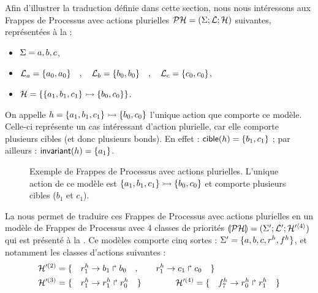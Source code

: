 \begin{example}
  Afin d'illustrer la traduction définie dans cette section,
  nous nous intéressons aux Frappes de Processus avec actions plurielles
  $\mathcal{PH} = (\Sigma; \mathcal{L}; \mathcal{H})$ suivantes,
  représentées à la  :
  \begin{itemize}
    \item $\Sigma = {a, b, c}$,
    \item $\mathcal{L}_a = \{ a_0, a_0\} \quad,\quad \mathcal{L}_b = \{ b_0, b_0 \} \quad,\quad
      \mathcal{L}_c = \{ c_0, c_0\}$,
    \item $\mathcal{H} = \{ \mbox{$\{a_1, b_1, c_1\} \rightarrowtail \{b_0, c_0\}$} \}$.
  \end{itemize}
  On appelle $h = \mbox{$\{a_1, b_1, c_1\} \rightarrowtail \{b_0, c_0\}$}$
  l'unique action que comporte ce modèle.
  Celle-ci représente un cas intéressant d'action plurielle,
  car elle comporte plusieurs cibles (et donc plusieurs bonds).
  En effet : $\mathsf{cible}(h) = \{ b_1, c_1 \}$ ;
  par ailleurs : $\mathsf{invariant}(h) = \{ a_1 \}$.
  
  \begin{figure}[p]
  \begin{center}
  \caption{%
    Exemple de Frappes de Processus avec actions plurielles.
    L'unique action de ce modèle est $\mbox{$\{a_1, b_1, c_1\} \rightarrowtail \{b_0, c_0\}$}$
    et comporte plusieurs cibles ($b_1$ et $c_1$).
  }
  \end{center}
  \end{figure}
  
  La  nous permet de traduire ces Frappes de Processus avec actions plurielles
  en un modèle de Frappes de Processus avec 4 classes de priorités
  $\llparenthesis \mathcal{PH} \rrparenthesis = (\Sigma'; \mathcal{L}'; \mathcal{H}'^{\langle 4 \rangle})$
  qui est présenté à la .
  Ce modèles comporte cinq sortes :
  $\Sigma' = \{ a, b, c, r^{h}, f^{h} \}$,
  et notamment les classes d'actions suivantes :
  \begin{align*}
    \mathcal{H}'^{(2)} &= \{\quad r^{h}_1\rightarrow b_1\Rsh b_0 \quad,
      \qquad r^{h}_1\rightarrow c_1\Rsh c_0 \quad\} \\
    \mathcal{H}'^{(3)} &= \{\quad r^{h}_1\rightarrow r^{h}_1\Rsh r^{h}_0 \quad\} \qquad\qquad
      \mathcal{H}'^{(4)} = \{\quad f^{h}_7\rightarrow r^{h}_0\Rsh r^{h}_1 \quad\}
  \end{align*}
  

\end{example}
